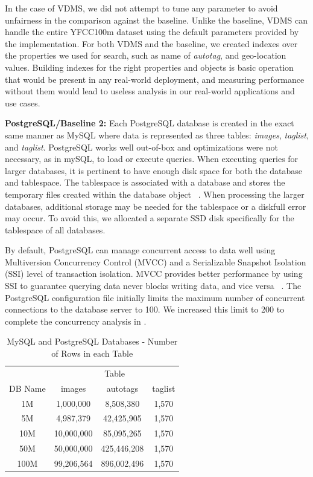 In the case of VDMS, we did not attempt to tune any
parameter to avoid unfairness in the comparison against the baseline.
Unlike the baseline, VDMS can handle the entire YFCC100m dataset using the default parameters provided by the implementation.
For both VDMS and the baseline, we created indexes over the
properties we used for search, such as name of
\textit{autotag}, and geo-location values.
Building indexes for the right properties and objects
is basic operation that would be present in any real-world deployment,
and measuring performance without them would lead to useless analysis in our
real-world applications and use cases.

\textbf{PostgreSQL/Baseline 2:}
Each PostgreSQL database is created in the exact same manner as MySQL
where data is represented as three tables:
\textit{images}, \textit{taglist}, and \textit{taglist}.
PostgreSQL works well out-of-box and optimizations were not necessary,
as in mySQL, to load or execute queries.
When executing queries for larger databases,
it is pertinent to have enough disk space for both
the database and tablespace.
The tablespace is associated with a database and stores the temporary files
created within the database object ~\cite{postgresql}.
When processing the larger databases, additional
storage may be needed for the tablespace or a diskfull error may occur.
To avoid this, we allocated a separate SSD disk specifically
for the tablespace of all databases.

By default, PostgreSQL can manage concurrent access to data well using
Multiversion Concurrency Control (MVCC) and a Serializable Snapshot Isolation
(SSI) level of transaction isolation.
MVCC provides better performance by using SSI to guarantee querying data never
blocks writing data, and vice versa ~\cite{postgresql}.
The PostgreSQL configuration file initially limits the maximum
number of concurrent connections to the database server to 100.
We increased this limit to 200 to complete the concurrency analysis
in \label{concurrency analysis}.

\begin{table}[ht]
\caption{MySQL and PostgreSQL Databases - Number of Rows in each Table}
\centering
\begin{tabular}{c c c c}
\hline\hline
 & \multicolumn{3}{c}{Table}\\
\cline{2-4}
DB Name & images & autotags & taglist\\
\hline
1M   & 1,000,000  & 8,508,380   & 1,570\\
5M   & 4,987,379  & 42,425,905  & 1,570\\
10M  & 10,000,000 & 85,095,265  & 1,570\\
50M  & 50,000,000 & 425,446,208 & 1,570\\
100M & 99,206,564 & 896,002,496 & 1,570\\
\hline
\end{tabular}
\label{table:mysqltables}
\end{table}

